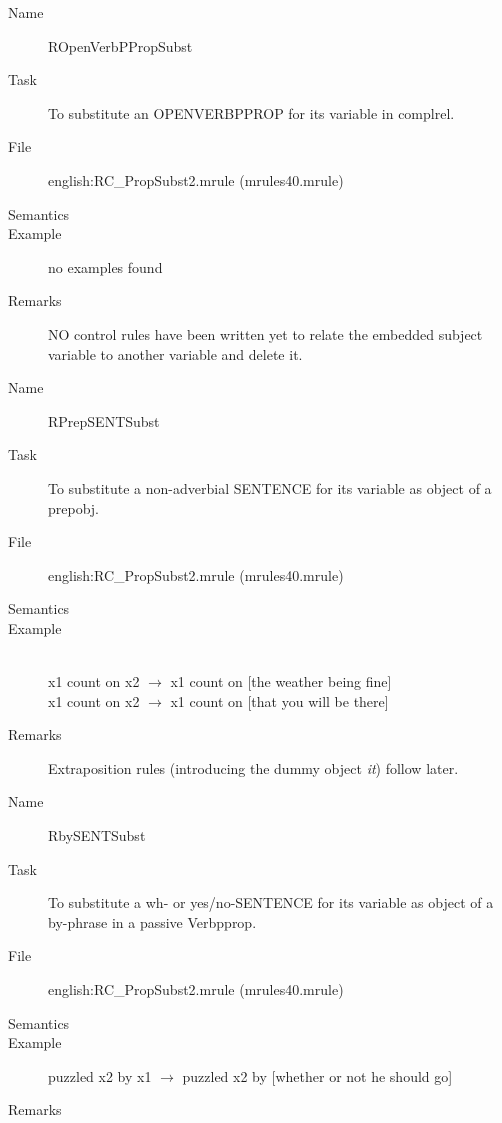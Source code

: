 \begin{description}
\vspace{1 cm}
\begin{description}
\item[Name] ROpenVerbPPropSubst
\item[Task] To substitute an OPENVERBPPROP for its variable in 
complrel. 
\item[File] english:RC\_PropSubst2.mrule (mrules40.mrule)
\item[Semantics]
\item[Example] no examples found
\item[Remarks] NO control rules have been written yet to relate the embedded 
subject variable to another variable and delete it.
\end{description}

\vspace{1 cm}
\begin{description}
\item[Name]   RPrepSENTSubst
\item[Task] To substitute a non-adverbial 
SENTENCE for its variable as object of a prepobj.
\item[File] english:RC\_PropSubst2.mrule (mrules40.mrule)
\item[Semantics]
\item[Example] \mbox{}\\
x1 count on x2 $\rightarrow$ x1 count on [the weather being fine]\\
x1 count on x2 $\rightarrow$ x1 count on [that you will be there]
\item[Remarks] Extraposition rules (introducing the dummy object {\em it\/}) 
follow later.
\end{description}

\vspace{1 cm}
\begin{description}
\item[Name] RbySENTSubst
\item[Task] To substitute a wh- or yes/no-SENTENCE for its variable as object 
of a by-phrase in a passive Verbpprop.
\item[File] english:RC\_PropSubst2.mrule (mrules40.mrule)
\item[Semantics]
\item[Example] puzzled x2 by x1 $\rightarrow$ puzzled x2 by [whether or not he
should go]
\item[Remarks]
\end{description}


\end{description}
